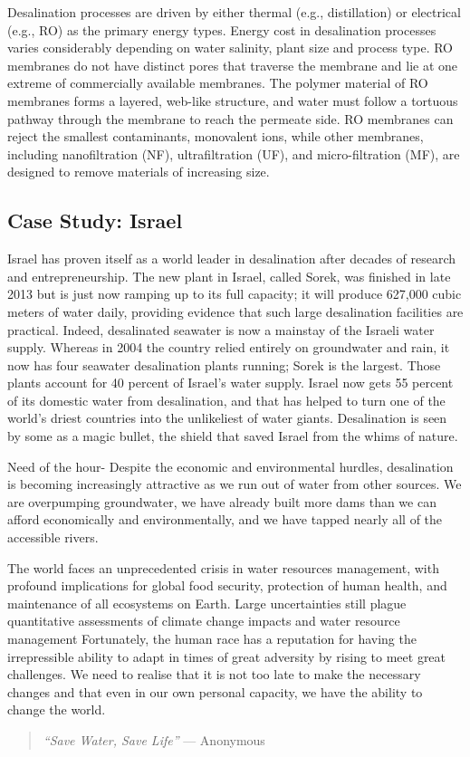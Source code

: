 \documentclass[11pt]{article} %
\begin{document}
\begin{multicols}{2}
Desalination processes are driven by either thermal (e.g., distillation) or electrical 
(e.g., RO) as the primary energy types. Energy cost in desalination processes varies 
considerably depending on water salinity, plant size and process type. RO 
membranes do not have distinct pores that traverse the membrane and lie at one 
extreme of commercially available membranes. The polymer material of RO 
membranes forms a layered, web-like structure, and water must follow a tortuous 
pathway through the membrane to reach the permeate side. RO membranes can 
reject the smallest contaminants, monovalent ions, while other membranes, 
including nanofiltration (NF), ultrafiltration (UF), and micro-filtration (MF), are 
designed to remove materials of increasing size.

\subsection*{Case Study: Israel}

Israel has proven itself as a world leader in desalination after decades of research 
and entrepreneurship. The new plant in Israel, called Sorek, was finished in late 
2013 but is just now ramping up to its full capacity; it will produce 627,000 cubic 
meters of water daily, providing evidence that such large desalination facilities are 
practical. Indeed, desalinated seawater is now a mainstay of the Israeli water 
supply. Whereas in 2004 the country relied entirely on groundwater and rain, it 
now has four seawater desalination plants running; Sorek is the largest. Those 
plants account for 40 percent of Israel's water supply. Israel now gets 55 percent of 
its domestic water from desalination, and that has helped to turn one of the world's 
driest countries into the unlikeliest of water giants. Desalination is seen by some as 
a magic bullet, the shield that saved Israel from the whims of nature.

Need of the hour-
Despite the economic and environmental hurdles, desalination is becoming 
increasingly attractive as we run out of water from other sources. We are 
overpumping groundwater, we have already built more dams than we can afford 
economically and environmentally, and we have tapped nearly all of the accessible 
rivers.


The world faces an unprecedented crisis in water resources management, 
with profound implications for global food security, protection of human health, 
and maintenance of all ecosystems on Earth. Large uncertainties still plague 
quantitative assessments of climate change impacts and water resource 
management
Fortunately, the human race has a reputation for having the irrepressible ability to 
adapt in times of great adversity by rising to meet great challenges. We need to 
realise that it is not too late to make the necessary changes and that even in our 
own personal capacity, we have the ability to change the world.

\begin{quote}
\textsl{``Save Water, Save Life''} --- \textrm{Anonymous}
\end{quote}


\end{multicols}

\deco{10pt}{$\clubsuit$~$\clubsuit$~$\clubsuit$}
\end{document}
